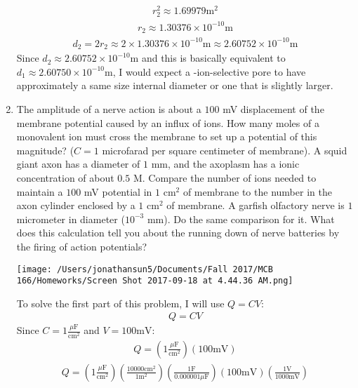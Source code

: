 \documentclass[11pt]{article}
\begin{document}
\begin{enumerate}[label=\arabic*.]
\begin{align*}
r_2^2 \approx 1.69979 \text{m}^2
\end{align*}
\begin{align*}
r_2 \approx 1.30376 \times 10^{-10} \text{m}
\end{align*}
\begin{align*}
d_2 = 2r_2 \approx 2 \times 1.30376 \times 10^{-10} \text{m} \approx 2.60752 \times 10^{-10} \text{m}
\end{align*}
Since $d_2 \approx 2.60752 \times 10^{-10} \text{m}$ and this is basically equivalent to $d_1 \approx 2.60750 \times 10^{-10} \text{m}$, I would expect a -ion-selective
pore to have approximately a same size internal diameter or one that is slightly larger.



\newpage
\item
The amplitude of a nerve action is about a $100$ mV displacement of the membrane potential caused by an influx of  ions. How many moles of a monovalent ion must cross the membrane to set up a potential of this magnitude? ($C = 1$ microfarad per square centimeter of membrane). A squid giant axon has a diameter of $1$ mm, and the axoplasm has a ionic concentration of about $0.5$ M. Compare the number of ions needed to maintain a $100$ mV potential in $1$ cm$^2$ of membrane to the number in the axon cylinder enclosed by a $1$ cm$^2$ of membrane. A garfish olfactory nerve is $1$ micrometer in diameter ($10^{-3}$ mm). Do the same comparison for it. What does this calculation tell you about the running down of nerve batteries by the firing of action potentials?
\begin{center}
\texttt{[image: /Users/jonathansun5/Documents/Fall 2017/MCB 166/Homeworks/Screen Shot 2017-09-18 at 4.44.36 AM.png]}
\end{center}
To solve the first part of this problem, I will use $Q = C V$:
\begin{align*}
Q = C V
\end{align*}
Since $C = 1 \frac{\mu \text{F}} {\text{cm}^2}$ and $V = 100 \text{mV}$:
\begin{align*}
Q = \left(1 \frac{\mu \text{F}} {\text{cm}^2}\right) \left(100 \text{mV}\right)
\end{align*}
\begin{align*}
Q = \left(1 \frac{\mu \text{F}} {\text{cm}^2}\right) \left(\frac{10000 \text{cm}^2} {1 \text{m}^2}\right) \left(\frac{1\text{F}} {0.000001 \mu \text{F}}\right) \left(100 \text{mV}\right) \left(\frac{1\text{V}} {1000\text{mV}}\right)

\end{align*}
\end{enumerate}
\end{document}
